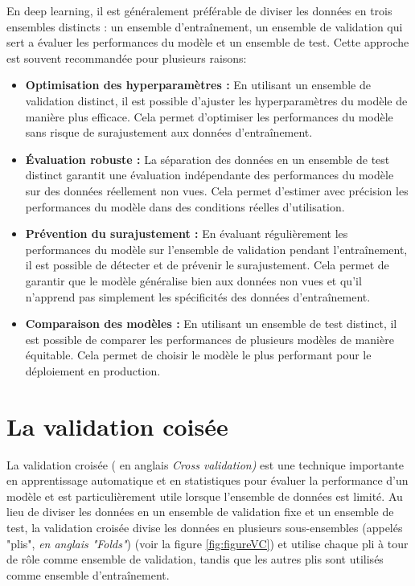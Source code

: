 En deep learning, il est généralement préférable de diviser les données en trois ensembles distincts : un ensemble d'entraînement, un ensemble de validation qui sert a évaluer les performances du modèle et un ensemble de test. Cette approche est souvent recommandée pour plusieurs raisons: 

\begin{itemize}
    \item \textbf{Optimisation des hyperparamètres :} En utilisant un ensemble de validation distinct, il est possible d'ajuster les hyperparamètres du modèle de manière plus efficace. Cela permet d'optimiser les performances du modèle sans risque de surajustement aux données d'entraînement.
   
    \item \textbf{Évaluation robuste :} La séparation des données en un ensemble de test distinct garantit une évaluation indépendante des performances du modèle sur des données réellement non vues. Cela permet d'estimer avec précision les performances du modèle dans des conditions réelles d'utilisation.
    
    \item \textbf{Prévention du surajustement :} En évaluant régulièrement les performances du modèle sur l'ensemble de validation pendant l'entraînement, il est possible de détecter et de prévenir le surajustement. Cela permet de garantir que le modèle généralise bien aux données non vues et qu'il n'apprend pas simplement les spécificités des données d'entraînement.
    
    \item \textbf{Comparaison des modèles : }En utilisant un ensemble de test distinct, il est possible de comparer les performances de plusieurs modèles de manière équitable. Cela permet de choisir le modèle le plus performant pour le déploiement en production.
\end{itemize}





\section{La validation coisée}
La validation croisée ( en anglais \textit{Cross validation)} est une technique importante en apprentissage automatique et en statistiques pour évaluer la performance d'un modèle et est particulièrement utile lorsque l'ensemble de données est limité. Au lieu de diviser les données en un ensemble de validation fixe et un ensemble de test, la validation croisée divise les données en plusieurs sous-ensembles (appelés "plis", \textit{en anglais "Folds"}) (voir la figure \ref{fig:figureVC}) et utilise chaque pli à tour de rôle comme ensemble de validation, tandis que les autres plis sont utilisés comme ensemble d'entraînement.\par

